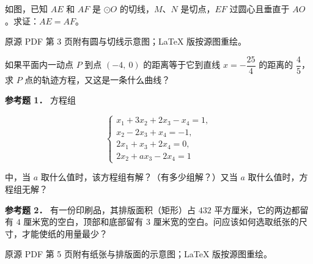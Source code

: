 \begin{question}
如图，已知 $AE$ 和 $AF$ 是 $\odot O$ 的切线，$M\text{、}N$ 是切点，$EF$ 过圆心且垂直于 $AO$。求证：$AE=AF$。

\begin{gktip}
原源 PDF 第 3 页附有圆与切线示意图；LaTeX 版按源图重绘。
\end{gktip}
\nopagebreak[4]
\begin{center}\end{center}
\nopagebreak[4]
\Needspace{0.4\textheight}
\end{question}
\begin{question}
如果平面内一动点 $P$ 到点 $(-4,\ 0)$ 的距离等于它到直线 $x=-\dfrac{25}{4}$ 的距离的 $\dfrac{4}{5}$，求 $P$ 点的轨迹方程，又这是一条什么曲线？

\textbf{参考题 1．} 方程组

\nopagebreak[4]
\[
\begin{cases}
x_1+3x_2+2x_3-x_4=1,\\
x_2-2x_3+x_4=-1,\\
2x_1+x_3+2x_4=0,\\
2x_2+ax_3-2x_4=1
\end{cases}
\]

中，当 $a$ 取什么值时，该方程组有解？（有多少组解？）又当 $a$ 取什么值时，方程组无解？

\textbf{参考题 2．} 有一份印刷品，其排版面积（矩形）占 $432$ 平方厘米，它的两边都留有 $4$ 厘米宽的空白，顶部和底部留有 $3$ 厘米宽的空白。问应该如何选取纸张的尺寸，才能使纸的用量最少？

\begin{gktip}
原源 PDF 第 5 页附有纸张与排版面的示意图；LaTeX 版按源图重绘。
\end{gktip}
\nopagebreak[4]
\begin{center}\end{center}
\nopagebreak[4]

\end{question}
